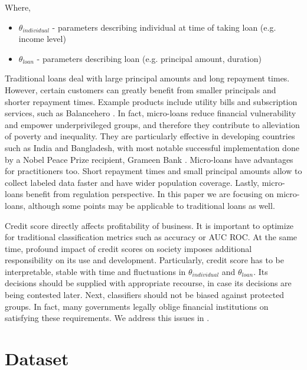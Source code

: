 \documentclass{article}
\begin{document}
\begin{samepage}
Where,
\begin{itemize}
    \item[] $\theta_{individual}$ - parameters describing individual at time of taking loan (e.g. income level)
    \item[] $\theta_{loan}$ - parameters describing loan (e.g. principal amount, duration)
\end{itemize}
\end{samepage}

Traditional loans deal with large principal amounts and long repayment times. However, certain customers can greatly benefit from smaller principals and shorter repayment times. Example products include utility bills and subscription services, such as Balancehero \cite{balancehero}. In fact, micro-loans reduce financial vulnerability and empower underprivileged groups, and therefore they contribute to alleviation of poverty and inequality. They are particularly effective in developing countries such as India and Bangladesh, with most notable successful implementation done by a Nobel Peace Prize recipient, Grameen Bank \cite{credit-micro, credit-micro-india-1}. Micro-loans have advantages for practitioners too. Short repayment times and small principal amounts allow to collect labeled data faster and have wider population coverage. Lastly, micro-loans benefit from regulation perspective. In this paper we are focusing on micro-loans, although some points may be applicable to traditional loans as well.

Credit score directly affects profitability of business. It is important to optimize for traditional classification metrics such as accuracy or AUC ROC. At the same time, profound impact of credit scores on society imposes additional responsibility on its use and development. Particularly, credit score has to be interpretable, stable with time and fluctuations in $\theta_{individual}$ and $\theta_{loan}$. Its decisions should be supplied with appropriate recourse, in case its decisions are being contested later. Next, classifiers should not be biased against protected groups. In fact, many governments legally oblige financial institutions on satisfying these requirements. We address this issues in .

\section{Dataset}
\label{sec:data}
\end{document}
